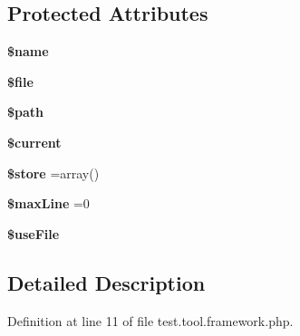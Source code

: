 \subsection*{Protected Attributes}
\begin{DoxyCompactItemize}
\item 
\hypertarget{classlog_ab2fc40d43824ea3e1ce5d86dee0d763b}{{\bfseries \$name}}\label{classlog_ab2fc40d43824ea3e1ce5d86dee0d763b}

\item 
\hypertarget{classlog_aa1bfbd27060176201b271918dff57e8f}{{\bfseries \$file}}\label{classlog_aa1bfbd27060176201b271918dff57e8f}

\item 
\hypertarget{classlog_a0a4baf0b22973c07685c3981f0d17fc4}{{\bfseries \$path}}\label{classlog_a0a4baf0b22973c07685c3981f0d17fc4}

\item 
\hypertarget{classlog_a2c4c58e377f6c66ca38c8ea97666fc5e}{{\bfseries \$current}}\label{classlog_a2c4c58e377f6c66ca38c8ea97666fc5e}

\item 
\hypertarget{classlog_a827b42f70d98e1bf51ff54dbbe771421}{{\bfseries \$store} =array()}\label{classlog_a827b42f70d98e1bf51ff54dbbe771421}

\item 
\hypertarget{classlog_afae5850468ea69a528a75f3b18baae68}{{\bfseries \$max\-Line} =0}\label{classlog_afae5850468ea69a528a75f3b18baae68}

\item 
\hypertarget{classlog_a9900990865c5a574470a0d9886825c56}{{\bfseries \$use\-File}}\label{classlog_a9900990865c5a574470a0d9886825c56}

\end{DoxyCompactItemize}


\subsection{Detailed Description}


Definition at line 11 of file test.\-tool.\-framework.\-php.



